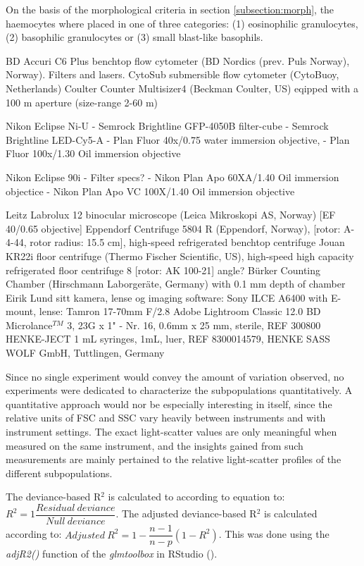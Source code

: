  On the basis of the morphological criteria in section \ref{subsection:morph}, the haemocytes where placed in one of three categories: (1) eosinophilic granulocytes, (2) basophilic granulocytes or (3) small blast-like basophils. 



BD Accuri C6 Plus benchtop flow cytometer (BD Nordics (prev. Puls Norway), Norway). Filters and lasers.
CytoSub submersible flow cytometer (CytoBuoy, Netherlands)
Coulter Counter Multisizer4 (Beckman Coulter, US) eqipped with a 100 \micro m aperture (size-range 2-60 \micro m)

Nikon Eclipse Ni-U
- Semrock Brightline GFP-4050B filter-cube
- Semrock Brightline LED-Cy5-A
- Plan Fluor 40x/0.75 water immersion objective,
- Plan Fluor 100x/1.30 Oil immersion objective

Nikon Eclipse 90i
- Filter specs?
- Nikon Plan Apo 60XA/1.40 Oil immersion objectice
- Nikon Plan Apo VC 100X/1.40 Oil immersion objective

Leitz Labrolux 12 binocular microscope (Leica Mikroskopi AS, Norway) [EF 40/0.65 objective]
Eppendorf Centrifuge 5804 R (Eppendorf, Norway), [rotor: A-4-44, rotor radius: 15.5 cm], high-speed refrigerated benchtop centrifuge
Jouan KR22i floor centrifuge (Thermo Fischer Scientific, US), high-speed high capacity refrigerated floor centrifuge 8 [rotor: AK 100-21] angle?
Bürker Counting Chamber (Hirschmann Laborgeräte, Germany) with 0.1 mm depth of chamber
Eirik Lund sitt kamera, lense og imaging software: 
Sony ILCE A6400 with E-mount, lense: Tamron 17-70mm F/2.8 
Adobe\textsuperscript{\textregistered} Lightroom Classic 12.0 
BD Microlance$^{TM}$ 3, 23G x 1" - Nr. 16, 0.6mm x 25 mm, sterile, REF 300800
HENKE-JECT 1 mL syringes, 1mL, luer, REF 8300014579, HENKE SASS WOLF GmbH, Tuttlingen, Germany

Since no single experiment would convey the amount of variation observed, no experiments were dedicated to characterize the subpopulations quantitatively. A quantitative approach would nor be especially interesting in itself, since the relative units of FSC and SSC vary heavily between instruments and with instrument settings. The exact light-scatter values are only meaningful when measured on the same instrument, and the insights gained from such measurements are mainly pertained to the relative light-scatter profiles of the different subpopulations.

The deviance-based R$^{2}$ is calculated to according to equation to: $R^{2} = 1 \dfrac{Residual ~ deviance}{Null ~ deviance}$. The adjusted deviance-based R$^{2}$ is calculated according to: $Adjusted ~ R^{2} = 1 - \dfrac{n-1}{n-p}(1 - R^{2})$. This was done using the \emph{adjR2()} function of the \emph{glmtoolbox} in RStudio (\cite{RStudio}).

